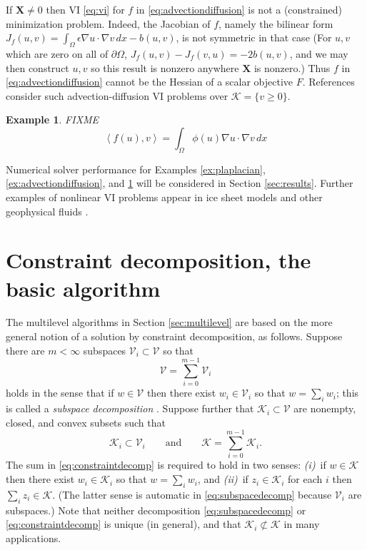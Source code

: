 \documentclass[letterpaper,final,12pt,reqno]{amsart}
\theoremstyle{cstyle}
\theoremstyle{cstyle*}
\theoremstyle{dstyle}
\newtheorem{example}[theorem]{Example}
\numberwithin{equation}{section}
\numberwithin{figure}{section}
\numberwithin{table}{section}
\numberwithin{theorem}{section}
\newcommand{\eps}{\epsilon}
\newcommand{\grad}{\nabla}
\newcommand{\bX}{\mathbf{X}}
\newcommand{\cK}{\mathcal{K}}
\newcommand{\cV}{\mathcal{V}}
\newcommand{\ip}[2]{\left<#1,#2\right>}
\begin{document}
If $\bX \ne 0$ then VI \eqref{eq:vi} for $f$ in \eqref{eq:advectiondiffusion} is not a (constrained) minimization problem.  Indeed, the Jacobian of $f$, namely the bilinear form $J_f(u,v) = \int_\Omega \eps \grad u \cdot \grad v\,dx - b(u,v)$, is not symmetric in that case  (For $u,v$ which are zero on all of $\partial \Omega$, $J_f(u,v) - J_f(v,u) = -2 b(u,v)$, and we may then construct $u,v$ so this result is nonzero anywhere $\bX$ is nonzero.)  Thus $f$ in \eqref{eq:advectiondiffusion} cannot be the Hessian of a scalar objective $F$.  References \cite{Bueler2021conservation,ChangNakshatrala2017} consider such advection-diffusion VI problems over $\cK = \{v\ge 0\}$.

\begin{example}  \label{ex:porous}  FIXME
\begin{equation}
\ip{f(u)}{v} = \int_\Omega \phi(u) \grad u \cdot \grad v\,dx \label{eq:porous}
\end{equation}
\end{example}

Numerical solver performance for Examples \ref{ex:plaplacian}, \ref{ex:advectiondiffusion}, and \ref{ex:porous} will be considered in Section \ref{sec:results}.  Further examples of nonlinear VI problems appear in ice sheet models \cite{Calvoetal2002,JouvetBueler2012} and other geophysical fluids \cite{Bueler2021conservation}.


\section{Constraint decomposition, the basic algorithm} \label{sec:cd}

The multilevel algorithms in Section \ref{sec:multilevel} are based on the more general notion of a solution by constraint decomposition, as follows.  Suppose there are $m<\infty$ subspaces $\cV_i \subset \cV$ so that
\begin{equation}
\cV = \sum_{i=0}^{m-1} \cV_i \label{eq:subspacedecomp}
\end{equation}
holds in the sense that if $w \in \cV$ then there exist $w_i \in \cV_i$ so that $w = \sum_i w_i$; this is called a \emph{subspace decomposition} \cite{Xu1992}.  Suppose further that $\cK_i \subset \cV$ are nonempty, closed, and convex subsets such that
\begin{equation}
\cK_i \subset \cV_i \qquad \text{and} \qquad \cK = \sum_{i=0}^{m-1} \cK_i. \label{eq:constraintdecomp}
\end{equation}
The sum in \eqref{eq:constraintdecomp} is required to hold in two senses: \emph{(i)}~if $w \in \cK$ then there exist $w_i \in \cK_i$ so that $w = \sum_i w_i$, and \emph{(ii)}~if $z_i \in \cK_i$ for each $i$ then $\sum_i z_i \in \cK$.  (The latter sense is automatic in \eqref{eq:subspacedecomp} because $\cV_i$ are subspaces.)  Note that neither decomposition \eqref{eq:subspacedecomp} or \eqref{eq:constraintdecomp} is unique (in general), and that $\cK_i \not\subset \cK$ in many applications.
\end{document}
